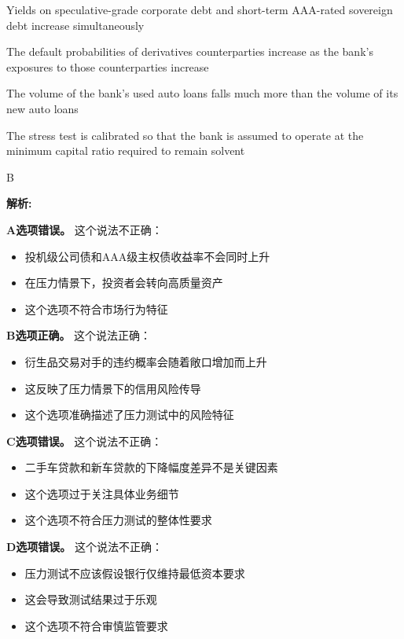 \documentclass{article}
\newenvironment{explanation}
{\textbf{解析:}\par}
{\par}
\begin{document}
\begin{choices}
    \item Yields on speculative-grade corporate debt and short-term AAA-rated sovereign debt increase simultaneously
    \item The default probabilities of derivatives counterparties increase as the bank's exposures to those counterparties increase
    \item The volume of the bank's used auto loans falls much more than the volume of its new auto loans
    \item The stress test is calibrated so that the bank is assumed to operate at the minimum capital ratio required to remain solvent
\end{choices}

\begin{correctanswer}
    B
\end{correctanswer}

\begin{explanation}
    \textbf{A选项错误。}
    这个说法不正确：
    \begin{itemize}
        \item 投机级公司债和AAA级主权债收益率不会同时上升
        \item 在压力情景下，投资者会转向高质量资产
        \item 这个选项不符合市场行为特征
    \end{itemize}

    \textbf{B选项正确。}
    这个说法正确：
    \begin{itemize}
        \item 衍生品交易对手的违约概率会随着敞口增加而上升
        \item 这反映了压力情景下的信用风险传导
        \item 这个选项准确描述了压力测试中的风险特征
    \end{itemize}

    \textbf{C选项错误。}
    这个说法不正确：
    \begin{itemize}
        \item 二手车贷款和新车贷款的下降幅度差异不是关键因素
        \item 这个选项过于关注具体业务细节
        \item 这个选项不符合压力测试的整体性要求
    \end{itemize}

    \textbf{D选项错误。}
    这个说法不正确：
    \begin{itemize}
        \item 压力测试不应该假设银行仅维持最低资本要求
        \item 这会导致测试结果过于乐观
        \item 这个选项不符合审慎监管要求
    \end{itemize}
\end{explanation}
\end{document}
